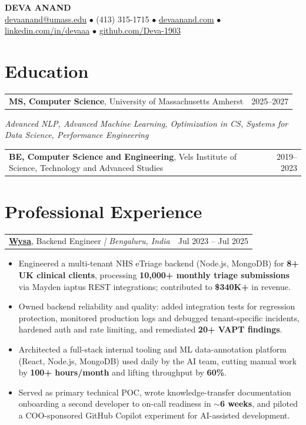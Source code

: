 \documentclass[letterpaper,11pt]{article}
\makeatletter
\newcommand{\eduItem}[3]{%
  \begin{tabular*}{\textwidth}{@{}l@{\extracolsep{\fill}}r@{}}
    \textbf{#1}, #2 & #3 \\
  \end{tabular*}\par
}
\newcommand{\expItem}[4]{%
  \vspace{3pt}
  \begin{tabular*}{\textwidth}{@{}l@{\extracolsep{\fill}}r@{}}
    \textbf{#1}, #2 \textit{| #3} & #4 \\
  \end{tabular*}\par\vspace{-2pt}
}
\makeatother
\begin{document}
\begin{center}
    {\fontsize{18}{20}\selectfont\bfseries DEVA ANAND}\\ \vspace{3pt}
    {\small
    \href{mailto:devaanand@umass.edu}{devaanand@umass.edu}
    \enspace$\bullet$\enspace
    (413) 315-1715
    \enspace$\bullet$\enspace
    \href{https://devaanand.com}{devaanand.com}
    \enspace$\bullet$\enspace
    \href{https://linkedin.com/in/devaaa/}{linkedin.com/in/devaaa}
    \enspace$\bullet$\enspace
    \href{https://github.com/Deva-1903}{github.com/Deva-1903}}
\end{center}
\vspace{-6pt}

\section{Education}
\eduItem{MS, Computer Science}{University of Massachusetts Amherst}{2025--2027}
{\small\textit{Advanced NLP, Advanced Machine Learning, Optimization in CS, Systems for Data Science, Performance Engineering}}\par
\vspace{3pt}
\eduItem{BE, Computer Science and Engineering}{Vels Institute of Science, Technology and Advanced Studies}{2019--2023}

\section{Professional Experience}

\expItem{\href{https://www.wysa.io}{Wysa}}{Backend Engineer}{Bengaluru, India}{Jul 2023 -- Jul 2025}
\begin{itemize}
  \item Engineered a multi-tenant NHS eTriage backend (Node.js, MongoDB) for \textbf{8+ UK clinical clients}, processing \textbf{10{,}000+ monthly triage submissions} via Mayden iaptus REST integrations; contributed to \textbf{\$340K+} in revenue.
  \item Owned backend reliability and quality: added integration tests for regression protection, monitored production logs and debugged tenant-specific incidents, hardened auth and rate limiting, and remediated \textbf{20+ VAPT findings}.
  \item Architected a full-stack internal tooling and ML data-annotation platform (React, Node.js, MongoDB) used daily by the AI team, cutting manual work by \textbf{100+ hours/month} and lifting throughput by \textbf{60\%}.
  \item Served as primary technical POC, wrote knowledge-transfer documentation onboarding a second developer to on-call readiness in \textbf{$\sim$6 weeks}, and piloted a COO-sponsored GitHub Copilot experiment for AI-assisted development.
\end{itemize}
\end{document}
